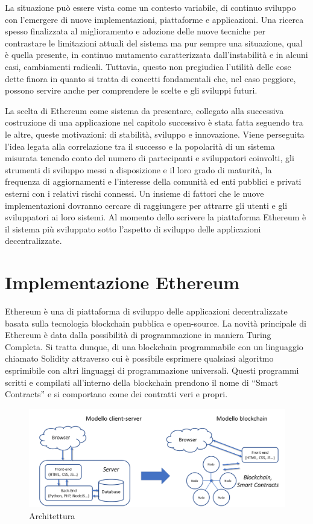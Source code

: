 La situazione può essere vista come un contesto variabile, di continuo sviluppo con l’emergere di nuove implementazioni, piattaforme e applicazioni. Una ricerca spesso finalizzata al miglioramento e adozione delle nuove tecniche per contrastare le limitazioni attuali del sistema ma pur sempre una situazione, qual è quella presente, in continuo mutamento caratterizzata dall'instabilità e in alcuni casi, cambiamenti radicali. Tuttavia, questo non pregiudica l’utilità delle cose dette finora in quanto si tratta di concetti fondamentali che, nel caso peggiore, possono servire anche per comprendere le scelte e gli sviluppi futuri. 

La scelta di Ethereum come sistema da presentare, collegato alla successiva costruzione di una applicazione nel capitolo successivo è stata fatta seguendo tra le altre, queste motivazioni: di stabilità, sviluppo e innovazione. Viene perseguita l'idea legata alla correlazione tra il successo e la popolarità di un sistema misurata tenendo conto del numero di partecipanti e sviluppatori coinvolti, gli strumenti di sviluppo messi a disposizione e il loro grado di maturità, la frequenza di aggiornamenti e l’interesse della comunità ed enti pubblici e privati esterni con i relativi rischi connessi. Un insieme di fattori che le nuove implementazioni dovranno cercare di raggiungere per attrarre gli utenti e gli sviluppatori ai loro sistemi. Al momento dello scrivere la piattaforma Ethereum è il sistema più sviluppato sotto l’aspetto di sviluppo delle applicazioni decentralizzate.

\section{Implementazione Ethereum}

Ethereum è una di piattaforma di sviluppo delle applicazioni decentralizzate basata sulla tecnologia blockchain pubblica e open-source.
La novità principale di Ethereum è data dalla possibilità di programmazione in maniera Turing Completa. Si tratta dunque, di una blockchain programmabile con un linguaggio chiamato Solidity attraverso cui è possibile esprimere qualsiasi algoritmo esprimibile con altri linguaggi di programmazione universali. Questi programmi scritti e compilati all’interno della blockchain prendono il nome di “Smart Contracts” e si comportano come dei contratti veri e propri. 

\begin{figure}[H]
\centering
\includegraphics[width=1\textwidth]{immagini/architetturav1.png}
\caption{Architettura}
\label{fig:mesh8}
\end{figure}

